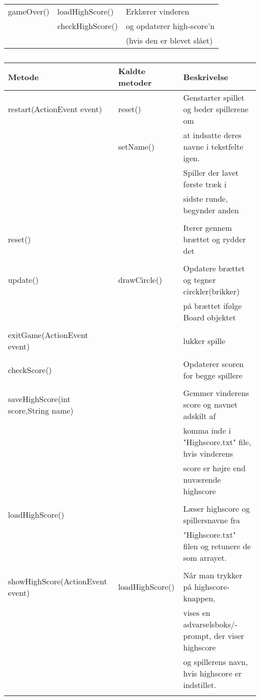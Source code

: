 \begin{table}[H]
\begin{tabular}{lll}
gameOver() & loadHighScore() & Erklærer vinderen\\
& checkHighScore() & og opdaterer high-score'n\\
&& (hvis den er blevet slået) \\


\bottomrule
\end{tabular}
\end{table}

\begin{table}[H]
\centering
\caption{}\label{tbl:2}
\begin{tabular}{lll}
\toprule
Metode & Kaldte metoder & Beskrivelse  \\
\midrule
restart(ActionEvent event) & reset() & Genstarter spillet og beder spillerene om   \\
& setName() & at indsatte deres navne  i tekstfelte igen.  \\
& & Spiller der lavet første træk i  \\
& & sidste runde, begynder anden \\
\\
reset() & & Iterer gennem brættet og rydder det \\
\\
update() & drawCircle() & Opdatere brættet og tegner circkler(brikker)  \\
& & på brættet ifølge Board objektet \\
\\
exitGame(ActionEvent event) & & lukker spille\\
\\
checkScore()& & Opdaterer scoren for begge spillere\\
\\

saveHighScore(int score,String name) & & Gemmer vinderens score og navnet adskilt af \\
& &  komma inde i "Highscore.txt" file, hvis vinderens  \\
& & score er højre end nuværende highscore\\
\\
loadHighScore() & & Læser highscore og spillersnavne fra \\
& & "Highscore.txt" filen og retunere de som arrayet.\\
\\
showHighScore(ActionEvent event) & loadHighScore() & Når man trykker på highscore-knappen, \\
& & vises en advarselsboks/-prompt, der viser highscore  \\
& & og spillerens navn, hvis highscore er indstillet. \\
\\


\end{tabular}
\end{table}
